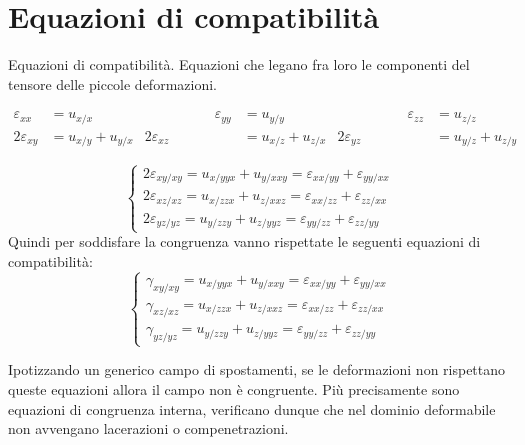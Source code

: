 \section{Equazioni di compatibilità}

\begin{definizioneBox}
Equazioni di compatibilità. Equazioni che legano fra loro le componenti del tensore delle piccole deformazioni.
\end{definizioneBox}

\begin{align*}
     \varepsilon_{xx} &= u_{x/x}& \quad \quad\quad\quad\quad \varepsilon_{yy} &= u_{y/y}& \quad \quad\quad\quad\quad \varepsilon_{zz} &= u_{z/z} \\
      2\varepsilon_{xy} &= u_{x/y} + u_{y/x} &
      2\varepsilon_{xz} &= u_{x/z} + u_{z/x} &
      2\varepsilon_{yz} &= u_{y/z} + u_{z/y} 
\end{align*}

\begin{equation*}
    \begin{cases}
        2\varepsilon_{xy/xy} = u_{x/yyx} + u_{y/xxy} 
        = \varepsilon_{xx/yy} + \varepsilon_{yy/xx} \\[8pt]
        
        2\varepsilon_{xz/xz} = u_{x/zzx} + u_{z/xxz} 
        = \varepsilon_{xx/zz} + \varepsilon_{zz/xx} \\[8pt]
        
        2\varepsilon_{yz/yz} = u_{y/zzy} + u_{z/yyz} 
        = \varepsilon_{yy/zz} + \varepsilon_{zz/yy}
    \end{cases}
\end{equation*}
Quindi per soddisfare la congruenza vanno rispettate le seguenti equazioni di compatibilità:
\begin{equation*}
    \begin{cases}
        \gamma_{xy/xy} = u_{x/yyx} + u_{y/xxy} 
        = \varepsilon_{xx/yy} + \varepsilon_{yy/xx} \\[8pt]
        
        \gamma_{xz/xz} = u_{x/zzx} + u_{z/xxz} 
        = \varepsilon_{xx/zz} + \varepsilon_{zz/xx} \\[8pt]
        
        \gamma_{yz/yz} = u_{y/zzy} + u_{z/yyz} 
        = \varepsilon_{yy/zz} + \varepsilon_{zz/yy}
    \end{cases}
\end{equation*}

Ipotizzando un generico campo di spostamenti, se le deformazioni non rispettano queste equazioni allora il campo non è congruente.
Più precisamente sono equazioni di congruenza interna, verificano dunque che nel dominio deformabile non avvengano lacerazioni o compenetrazioni.

